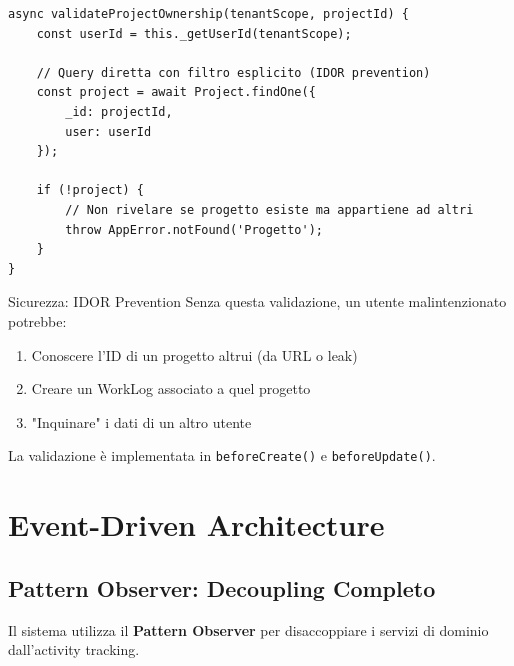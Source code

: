 \documentclass[11pt,a4paper]{article}
\begin{document}
\begin{lstlisting}[caption=Validazione Ownership Atomica]
async validateProjectOwnership(tenantScope, projectId) {
    const userId = this._getUserId(tenantScope);
    
    // Query diretta con filtro esplicito (IDOR prevention)
    const project = await Project.findOne({ 
        _id: projectId, 
        user: userId 
    });
    
    if (!project) {
        // Non rivelare se progetto esiste ma appartiene ad altri
        throw AppError.notFound('Progetto');
    }
}
\end{lstlisting}

\begin{warningbox}{Sicurezza: IDOR Prevention}
Senza questa validazione, un utente malintenzionato potrebbe:
\begin{enumerate}
    \item Conoscere l'ID di un progetto altrui (da URL o leak)
    \item Creare un WorkLog associato a quel progetto
    \item "Inquinare" i dati di un altro utente
\end{enumerate}
La validazione è implementata in \texttt{beforeCreate()} e \texttt{beforeUpdate()}.
\end{warningbox}

\section{Event-Driven Architecture}

\subsection{Pattern Observer: Decoupling Completo}

Il sistema utilizza il \textbf{Pattern Observer} per disaccoppiare i servizi di dominio dall'activity tracking.
\end{document}
